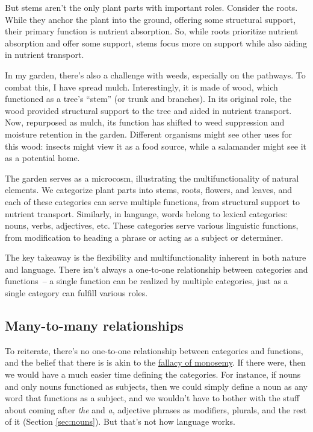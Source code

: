 But stems aren't the only plant parts with important roles. Consider the roots. While they anchor the plant into the ground, offering some structural support, their primary function is nutrient absorption. So, while roots prioritize nutrient absorption and offer some support, stems focus more on support while also aiding in nutrient transport.

In my garden, there's also a challenge with weeds, especially on the pathways. To combat this, I have spread mulch. Interestingly, it is made of wood, which functioned as a tree's ``stem'' (or trunk and branches). In its original role, the wood provided structural support to the tree and aided in nutrient transport. Now, repurposed as mulch, its function has shifted to weed suppression and moisture retention in the garden. Different organisms might see other uses for this wood: insects might view it as a food source, while a salamander might see it as a potential home.

The garden serves as a microcosm, illustrating the multifunctionality of natural elements. We categorize plant parts into stems, roots, flowers, and leaves, and each of these categories can serve multiple functions, from structural support to nutrient transport. Similarly, in language, words belong to lexical categories: nouns, verbs, adjectives, etc. These categories serve various linguistic functions, from modification to heading a phrase or acting as a subject or determiner.

The key takeaway is the flexibility and multifunctionality inherent in both nature and language. There isn't always a one-to-one relationship between categories and functions~-- a single function can be realized by multiple categories, just as a single category can fulfill various roles.

\subsection{Many-to-many relationships} \label{sec:many-to-many}
To reiterate, there's no one-to-one relationship between categories and functions, and the belief that there is is akin to the \hyperref[sec:fallacy-of-monosemy]{fallacy of monosemy}. If there were, then we would have a much easier time defining the categories. For instance, if nouns and only nouns functioned as subjects, then we could simply define a noun as any word that functions as a subject, and we wouldn't have to bother with the stuff about coming after \textit{the} and \textit{a}, adjective phrases as modifiers, plurals, and the rest of it (Section \ref{sec:nouns}). But that's not how language works.

